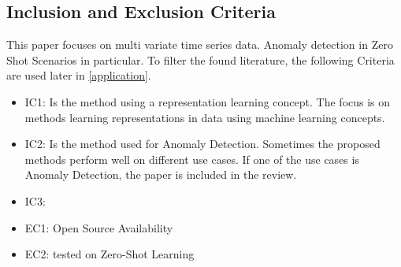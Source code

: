\subsection{Inclusion and Exclusion Criteria}
This paper focuses on multi variate time series data. Anomaly detection in Zero Shot Scenarios in particular. To filter the found literature, the following Criteria are used later in \ref{application}.

\label{list_criteria}
\begin{itemize}
\item IC1: Is the method using a representation learning concept. The focus is on methods learning representations in data using machine learning concepts.
\item IC2: Is the method used for Anomaly Detection. Sometimes the proposed methods perform well on different use cases. If one of the use cases is Anomaly Detection, the paper is included in the review.
\item IC3:
\end{itemize}

\begin{itemize}
\item EC1: Open Source Availability
\item EC2: tested on Zero-Shot Learning
\end{itemize}
